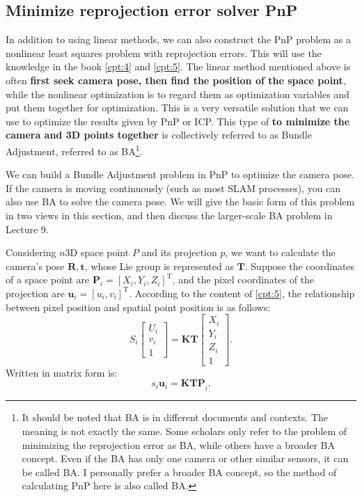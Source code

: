 \subsection{Minimize reprojection error solver PnP}
\label{sec:BA-vo1}
In addition to using linear methods, we can also construct the PnP problem as a nonlinear least squares problem with reprojection errors. This will use the knowledge in the book \ref{cpt:4} and \ref{cpt:5}. The linear method mentioned above is often \textbf{first seek camera pose, then find the position of the space point}, while the nonlinear optimization is to regard them as optimization variables and put them together for optimization. This is a very versatile solution that we can use to optimize the results given by PnP or ICP. This type of \textbf{to minimize the camera and 3D points together} is collectively referred to as Bundle Adjustment, referred to as BA\footnote{It should be noted that BA is in different documents and contexts. The meaning is not exactly the same. Some scholars only refer to the problem of minimizing the reprojection error as BA, while others have a broader BA concept. Even if the BA has only one camera or other similar sensors, it can be called BA. I personally prefer a broader BA concept, so the method of calculating PnP here is also called BA. }.

We can build a Bundle Adjustment problem in PnP to optimize the camera pose. If the camera is moving continuously (such as most SLAM processes), you can also use BA to solve the camera pose. We will give the basic form of this problem in two views in this section, and then discuss the larger-scale BA problem in Lecture 9.

Considering $n$3D space point $P$ and its projection $p$, we want to calculate the camera's pose $\bm{R}, \bm{t}$, whose Lie group is represented as $\bm{T}$. Suppose the coordinates of a space point are $\bm{P}_i=[X_i,Y_i,Z_i]^\mathrm{T}$, and the pixel coordinates of the projection are $\bm{u}_i=[u_i,v_i]^\mathrm{T}$. According to the content of \ref{cpt:5}, the relationship between pixel position and spatial point position is as follows:
\begin{equation}
S_i \left[
\begin{array}{l}
U_i \\ v_i \\ 1
\end{array}
\right] = \bm{K} \bm{T} \left[
\begin{array}{l}
X_i \\ Y_i \\ Z_i \\ 1
\end{array} \right] .
\end{equation}
Written in matrix form is:
\[
{{s_i {\bm{u}}_i} = \bm{K} \bm{T} \bm{P}}_i.
\]

